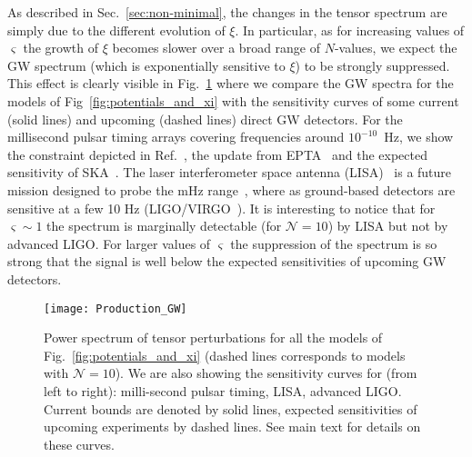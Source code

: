 
As described in Sec.~\ref{sec:non-minimal}, the changes in the tensor spectrum are simply due to the different evolution of $\xi$. In particular, as for increasing values of $\varsigma$ the growth of $\xi$ becomes slower over a broad range of $N$-values, we expect the GW spectrum (which is exponentially sensitive to $\xi$) to be strongly suppressed. This effect is clearly visible in Fig.~\ref{fig:GW} where we compare the GW spectra for the models of Fig~\ref{fig:potentials_and_xi} with the sensitivity curves of some current (solid lines) and upcoming (dashed lines) direct GW detectors. For the millisecond pulsar timing arrays covering frequencies around $10^{-10}$~Hz, we show the constraint depicted in Ref.~\cite{Smith:2005mm}, the update from EPTA~\cite{vanHaasteren:2011ni} and the expected sensitivity of SKA~\cite{Kramer:2004rwa}. The laser interferometer space antenna (LISA)~\cite{LISA} is a future mission designed to probe the mHz range~\cite{Petiteau, Caprini:2015zlo,Bartolo:2016ami}, where as ground-based detectors are sensitive at a few 10 Hz (LIGO/VIRGO~\cite{TheLIGOScientific:2016wyq}). It is interesting to notice that for $\varsigma \sim 1$ the spectrum is marginally detectable (for $\mathcal{N}=10$) by LISA but not by advanced LIGO. For larger values of $\varsigma$ the suppression of the spectrum is so strong that the signal is well below the expected sensitivities of upcoming GW detectors.


\begin{figure}
\centering
\texttt{[image: Production\_GW]}
\caption{Power spectrum of tensor perturbations for all the models of Fig.~\ref{fig:potentials_and_xi} (dashed lines corresponds to models with $\mathcal{N}=10$). We are also showing the sensitivity curves for (from left to right): milli-second pulsar timing, LISA, advanced LIGO. Current bounds are denoted by solid lines, expected sensitivities of upcoming experiments by dashed lines. See main text for details on these curves.}
\label{fig:GW}
\end{figure}

